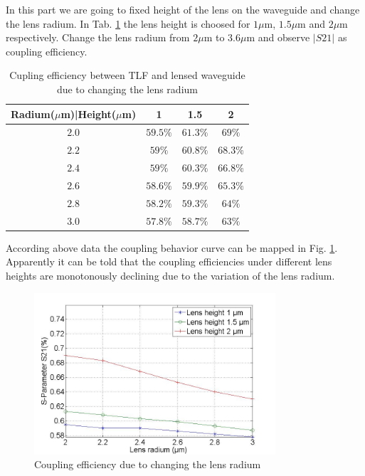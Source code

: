 In this part we are going to fixed height of the lens on the waveguide and change the lens radium.
In Tab. \ref{tab:coupling_lensed_waveguide_radium} the lens height is choosed for $1\mu$m, $1.5\mu$m and $2\mu$m respectively. Change the lens radium from $2\mu$m to $3.6\mu$m and observe $|S21|$ as coupling efficiency.

\begin{table}
\caption{Cupling efficiency between TLF and lensed waveguide due to changing the lens radium}
\centering
\begin{tabular}{|c|c|c|c|}
\hline
Radium($\mu$m)|Height($\mu$m)&	1&	1.5&2\\
\hline
$2.0$& $59.5\%$	&$61.3\%$	&$69\%$\\
$2.2$& $59\%$		&$60.8\%$	&$68.3\%$\\
$2.4$&$59\%$		&$60.3\%$	&$66.8\%$\\
$2.6$&$58.6\%$	&$59.9\%$	&$65.3\%$\\
$2.8$&$58.2\%$	&$59.3\%$	&$64\%$\\
$3.0$&$57.8\%$	&$58.7\%$	&$63\%$\\
\hline
\end{tabular}
\label{tab:coupling_lensed_waveguide_radium}
\end{table}

According above data the coupling behavior curve can be mapped in Fig. \ref{fig:coupling_lenses_curve_rxx}. Apparently it can be told that the coupling efficiencies under different lens heights are monotonously declining due to the variation of the lens radium.
\begin{figure}[!ht]
\includegraphics[width=0.8\textwidth]{bilder/s21_fix_lens_height_rxx}
\caption{Coupling efficiency due to changing the lens radium}
\label{fig:coupling_lenses_curve_rxx}
\end{figure}

